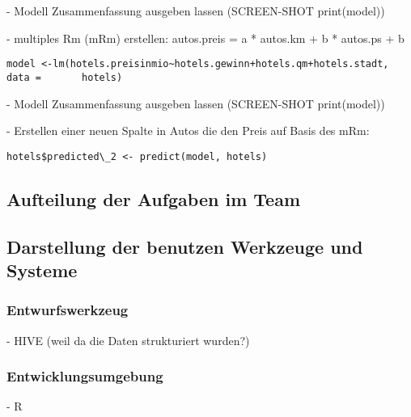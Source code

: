 - Modell Zusammenfassung ausgeben lassen (SCREEN-SHOT print(model))


- multiples Rm (mRm) erstellen: autos.preis = a * autos.km + b * autos.ps + b
\begin{lstlisting}
model <-lm(hotels.preisinmio~hotels.gewinn+hotels.qm+hotels.stadt, data =       hotels)
\end{lstlisting}

- Modell Zusammenfassung ausgeben lassen (SCREEN-SHOT print(model))


- Erstellen einer neuen Spalte in Autos die den Preis auf Basis des mRm:
\begin{lstlisting}
hotels$predicted\_2 <- predict(model, hotels)
\end{lstlisting}


\subsection{Aufteilung der Aufgaben im Team}
\subsection{Darstellung der benutzen Werkzeuge und Systeme}
\subsubsection*{Entwurfswerkzeug}
- HIVE (weil da die Daten strukturiert wurden?)

\subsubsection{Entwicklungsumgebung}
- R

